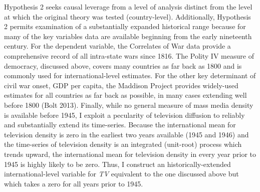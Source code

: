 \documentclass[11pt,article,oneside]{memoir}
\begin{document}
Hypothesis 2 seeks causal leverage from a level of analysis distinct
from the level at which the original theory was tested (country-level).
Additionally, Hypothesis 2 permits examination of a substantially
expanded historical range because for many of the key variables data are
available beginning from the early nineteenth century. For the dependent
variable, the Correlates of War data provide a comprehensive record of
all intra-state wars since 1816. The Polity IV measure of democracy,
discussed above, covers many countries as far back as 1800 and is
commonly used for international-level estimates. For the other key
determinant of civil war onset, GDP per capita, the Maddison Project
provides widely-used estimates for all countries as far back as
possible, in many cases extending well before 1800 (Bolt 2013). Finally,
while no general measure of mass media density is available before 1945,
I exploit a pecularity of television diffusion to reliably and
substantially extend its time-series. Because the international mean for
television density is zero in the earliest two years available (1945 and
1946) and the time-series of television density is an integrated
(unit-root) process which trends upward, the international mean for
television density in every year prior to 1945 is highly likely to be
zero. Thus, I construct an historically-extended international-level
variable for \emph{TV} equivalent to the one discussed above but which
takes a zero for all years prior to 1945.
\end{document}
